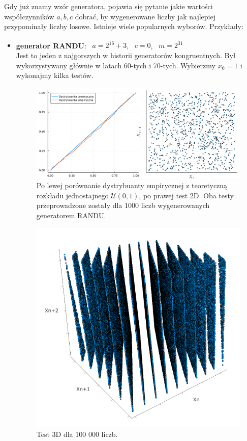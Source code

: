 \documentclass[12pt]{mwrep}
\begin{document}
	\noindent Gdy już znamy wzór generatora, pojawia się pytanie jakie wartości współczynników $a, b, c$ dobrać, by wygenerowane liczby jak najlepiej przypominały liczby losowe. Istnieje wiele popularnych wyborów. Przykłady:
	\begin{itemize}[leftmargin=10mm]
		
		\item \textbf{generator RANDU}\textsuperscript{\cite{generator}}: \ $a = 2^{16} + 3$, \ $c = 0$, \ $m = 2^{31}$\\
		Jest to jeden z najgorszych w historii generatorów kongruentnych. Był wykorzystywany głównie w latach 60-tych i 70-tych. Wybierzmy $x_0 = 1$ i wykonajmy kilka testów.
		\begin{figure}[H]
			\centering
			\caption{Po lewej porównanie dystrybuanty empirycznej z teoretyczną rozkładu jednostajnego $\mathcal{U}(0, 1)$, po prawej test 2D. Oba testy przeprowadzone zostały dla 1000 liczb wygenerowanych generatorem RANDU.}
			\includegraphics[scale=0.1]{fig/fig_gen1.png}
		\end{figure}
		\begin{figure}[H]
			\centering
			\caption{Test 3D dla 100 000 liczb.}
			\includegraphics[scale=0.7]{fig/fig_gen2.png}

\end{figure}
\end{itemize}
\end{document}
